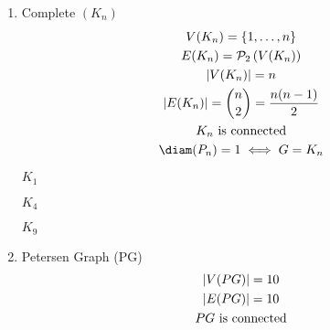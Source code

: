 \documentclass[letterpaper,12pt,fleqn]{article}
\begin{document}
\begin{enumerate}[left=0pt]
\item Complete \((K_n)\)
  \begin{gather*}
    V(K_n)=\set{1,\ldots,n} \\
    E(K_n)=\ps_2\left(V(K_n)\right) \\
    \abs{V(K_n)}=n \\
    \abs{E(K_n)}=\binom{n}{2}=\frac{n(n-1)}{2} \\
    K_n\ \text{is connected} \\
    \diam(P_n)=1\iff G=K_n
  \end{gather*}

  \begin{examples}
    \begin{minipage}{2in}
      \begin{center}

        \bigskip

        \(K_1\)
      \end{center}
    \end{minipage}
    \begin{minipage}{2in}
      \begin{center}

        \bigskip

        \(K_4\)
      \end{center}
    \end{minipage}
    \begin{minipage}{2in}
      \begin{center}

        \bigskip

        \(K_9\)
      \end{center}
    \end{minipage}
  \end{examples}

\item Petersen Graph (PG)
  \begin{gather*}
    \lvert V(PG)\rvert=10 \\
    \lvert E(PG)\rvert=10 \\
    PG\ \text{is connected}
  \end{gather*}


\end{enumerate}
\end{document}
